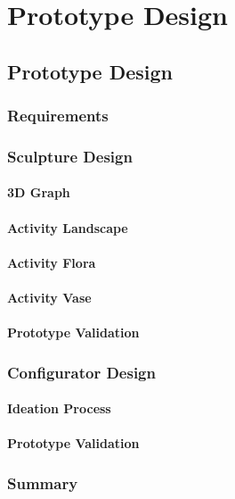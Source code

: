 \chapter{Prototype Design}
\label{ch:proto}
\section{Prototype Design}

\subsection{Requirements}
\subsection{Sculpture Design}
\subsubsection{3D Graph}
\subsubsection{Activity Landscape}
\subsubsection{Activity Flora}
\subsubsection{Activity Vase}
\subsubsection{Prototype Validation}
\subsection{Configurator Design}
\subsubsection{Ideation Process}
\subsubsection{Prototype Validation}
\subsection{Summary}


